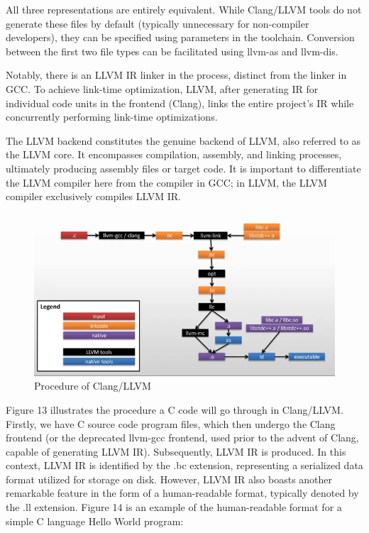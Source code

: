 \documentclass[conference]{IEEEtran}
\begin{document}
All three representations are entirely equivalent. While Clang/LLVM tools do not generate these files by default (typically unnecessary for non-compiler developers), they can be specified using parameters in the toolchain. Conversion between the first two file types can be facilitated using llvm-as and llvm-dis.

Notably, there is an LLVM IR linker in the process, distinct from the linker in GCC. To achieve link-time optimization, LLVM, after generating IR for individual code units in the frontend (Clang), links the entire project's IR while concurrently performing link-time optimizations.

The LLVM backend constitutes the genuine backend of LLVM, also referred to as the LLVM core. It encompasses compilation, assembly, and linking processes, ultimately producing assembly files or target code. It is important to differentiate the LLVM compiler here from the compiler in GCC; in LLVM, the LLVM compiler exclusively compiles LLVM IR.

\begin{figure}[htbp]
\centering
\includegraphics [width=0.95\linewidth]{pictures/ClangProcedure.png}
\caption{Procedure of Clang/LLVM\cite{b9}}
\label{fig13}
\end{figure}

Figure 13 illustrates the procedure a C code will go through in Clang/LLVM. Firstly, we have C source code program files, which then undergo the Clang frontend (or the deprecated llvm-gcc frontend, used prior to the advent of Clang, capable of generating LLVM IR). Subsequently, LLVM IR is produced. In this context, LLVM IR is identified by the .bc extension, representing a serialized data format utilized for storage on disk. However, LLVM IR also boasts another remarkable feature in the form of a human-readable format, typically denoted by the .ll extension. Figure 14 is an example of the human-readable format for a simple C language Hello World program:
\end{document}
